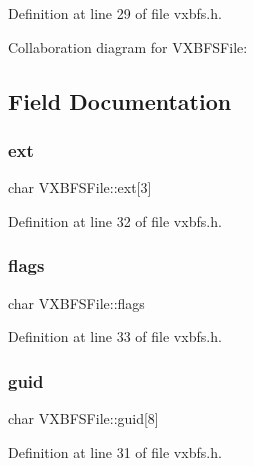 Definition at line 29 of file vxbfs.\+h.



Collaboration diagram for V\+X\+B\+F\+S\+File\+:


\subsection{Field Documentation}
\mbox{\label{a00336_ad030f5719e51b0b41b7cb6047f4110b2_ad030f5719e51b0b41b7cb6047f4110b2}} 
\subsubsection{\texorpdfstring{ext}{ext}}
{\footnotesize\ttfamily char V\+X\+B\+F\+S\+File\+::ext\mbox{[}3\mbox{]}}



Definition at line 32 of file vxbfs.\+h.

\mbox{\label{a00336_a8fc3bc64d7f2330f923507d2430bdde4_a8fc3bc64d7f2330f923507d2430bdde4}} 
\subsubsection{\texorpdfstring{flags}{flags}}
{\footnotesize\ttfamily char V\+X\+B\+F\+S\+File\+::flags}



Definition at line 33 of file vxbfs.\+h.

\mbox{\label{a00336_a03b954de114d8e01bb783ddef964e8ca_a03b954de114d8e01bb783ddef964e8ca}} 
\subsubsection{\texorpdfstring{guid}{guid}}
{\footnotesize\ttfamily char V\+X\+B\+F\+S\+File\+::guid\mbox{[}8\mbox{]}}



Definition at line 31 of file vxbfs.\+h.

